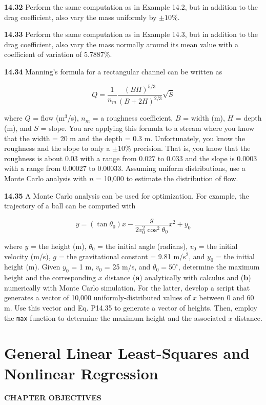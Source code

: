 \documentclass[../main.tex]{subfiles}
\begin{document}
\begin{multicols}{2}
	\noindent\textbf{14.32} Perform the same computation as in Example 14.2,
	but in addition to the drag coefficient, also vary the mass
	uniformly by $\pm 10\%$.

	\noindent\textbf{14.33} Perform the same computation as in Example 14.3,
	but in addition to the drag coefficient, also vary the mass
	normally around its mean value with a coefficient of variation of 5.7887\%.

	\noindent\textbf{14.34}  Manning's formula for a rectangular channel can be
	written as

	$$Q = \frac{1}{n_m} \frac{(BH) ^ {5/3}}{(B+2H) ^ {2/3}} \sqrt{S}$$

	\noindent where $Q$ = flow (m$^3$/s), $n_m$ = a roughness coefficient, $B$ =
	width (m), $H$ = depth (m), and $S$ = slope. You are applying
	this formula to a stream where you know that the width = 20 m
	and the depth = 0.3 m. Unfortunately, you know the roughness and the slope to only a $\pm 10\%$ precision. That is, you
	know that the roughness is about 0.03 with a range from 0.027
	to 0.033 and the slope is 0.0003 with a range from 0.00027
	to 0.00033. Assuming uniform distributions, use a Monte
	Carlo analysis with $n$ = 10,000 to estimate the distribution
	of flow.

	\noindent\textbf{14.35} A Monte Carlo analysis can be used for optimization.
	For example, the trajectory of a ball can be computed with

	\begin{equation}
		\tag{P14.35}
		y = (\tan \theta_0)x - \frac{g}{2 v^2_0 \cos ^2 \theta_0} x^2 + y_0
	\end{equation}

	\noindent where $y$ = the height (m), $\theta_0$ = the initial angle (radians),
	$v_0$ = the initial velocity (m/s), $g$ = the gravitational constant =
	9.81 m/s$^2$, and $y_0$ = the initial height (m). Given $y_0$ = 1 m,
	$v_0$ = 25 m/s, and $\theta_0 = 50^\circ$, determine the maximum height
	and the corresponding $x$ distance (\textbf{a}) analytically with calculus and (\textbf{b}) numerically with Monte Carlo simulation. For
	the latter, develop a script that generates a vector of 10,000
	uniformly-distributed values of $x$ between 0 and 60 m. Use
	this vector and Eq. P14.35 to generate a vector of heights.
	Then, employ the \texttt{max} function to determine the maximum
	height and the associated $x$ distance.
\end{multicols}

\label{cha:cha_P_15} %
\chapter{General Linear Least-Squares and Nonlinear Regression}
\textbf{CHAPTER OBJECTIVES}
\end{document}
